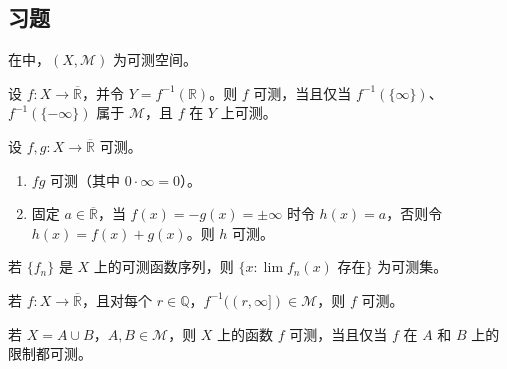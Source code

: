 \documentclass[../../main.tex]{subfiles}%
\begin{document}
\subsection*{习题}
在中，$(X,\mathscr{M})$ 为可测空间。
\begin{exercise}\label{exercise:ch02-extended-measurability}
设 $f:X\to\overline{\mathbb{R}}$，并令 $Y=f^{-1}(\mathbb{R})$。则 $f$ 可测，当且仅当 $f^{-1}(\{\infty\})$、$f^{-1}(\{-\infty\})$ 属于 $\mathscr{M}$，且 $f$ 在 $Y$ 上可测。
\end{exercise}
\begin{exercise}\label{exercise:ch02-extended-sum-product}
设 $f,g:X\to\overline{\mathbb{R}}$ 可测。
\begin{enumerate}
\item\label{item:ch02-extended-product} $fg$ 可测（其中 $0\cdot\infty=0$）。
\item\label{item:ch02-extended-sum} 固定 $a\in\overline{\mathbb{R}}$，当 $f(x)=-g(x)=\pm\infty$ 时令 $h(x)=a$，否则令 $h(x)=f(x)+g(x)$。则 $h$ 可测。
\end{enumerate}
\end{exercise}
\begin{exercise}\label{exercise:ch02-convergence-set}
若 $\{f_n\}$ 是 $X$ 上的可测函数序列，则 $\{x:\lim f_n(x)\text{ 存在}\}$ 为可测集。
\end{exercise}
\begin{exercise}\label{exercise:ch02-rational-rays}
若 $f:X\to\overline{\mathbb{R}}$，且对每个 $r\in\mathbb{Q}$，$f^{-1}((r,\infty])\in\mathscr{M}$，则 $f$ 可测。
\end{exercise}
\begin{exercise}\label{exercise:ch02-measurable-pasting}
若 $X=A\cup B$，$A,B\in\mathscr{M}$，则 $X$ 上的函数 $f$ 可测，当且仅当 $f$ 在 $A$ 和 $B$ 上的限制都可测。
\end{exercise}
\end{document}
